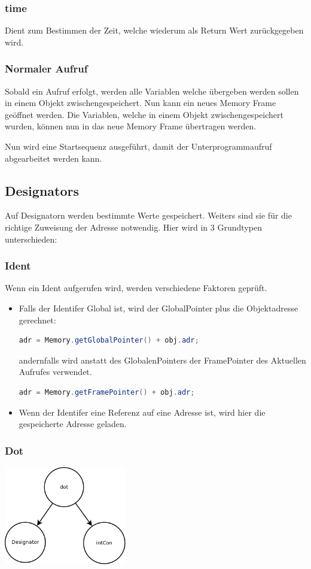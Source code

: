 \subsubsection{time}
Dient zum Bestimmen der Zeit, welche wiederum als Return Wert zurückgegeben wird.

\subsubsection{Normaler Aufruf}
Sobald ein Aufruf erfolgt, werden alle Variablen welche übergeben werden sollen in einem Objekt zwischengespeichert. Nun kann ein
neues Memory Frame geöffnet werden. Die Variablen, welche in einem Objekt zwischengespeichert wurden, können nun in das neue
Memory Frame übertragen werden.

Nun wird eine Startsequenz ausgeführt, damit der Unterprogrammaufruf abgearbeitet werden kann.

\subsection{Designators}
Auf Designatorn werden bestimmte Werte gespeichert. Weiters sind sie für die richtige Zuweisung der Adresse notwendig.
Hier wird in 3 Grundtypen unterschieden:


\subsubsection{Ident}
Wenn ein Ident aufgerufen wird, werden verschiedene Faktoren geprüft.
\begin{itemize}
 \item Falls der Identifer Global ist, wird der GlobalPointer plus die Objektadresse gerechnet:
 \begin{lstlisting}[language=JAVA]
 adr = Memory.getGlobalPointer() + obj.adr;	
  \end{lstlisting}
  andernfalls wird anstatt des GlobalenPointers der FramePointer des Aktuellen Aufrufes verwendet.
   \begin{lstlisting}[language=JAVA]
 adr = Memory.getFramePointer() + obj.adr;
  \end{lstlisting}
 \item Wenn der Identifer eine Referenz auf eine Adresse ist, wird hier die gespeicherte Adresse geladen.
\end{itemize}



\subsubsection{Dot}
\includegraphics[width=0.4\textwidth]{./media/images/interpreter/syntaxbaum/designators/dot.png}

